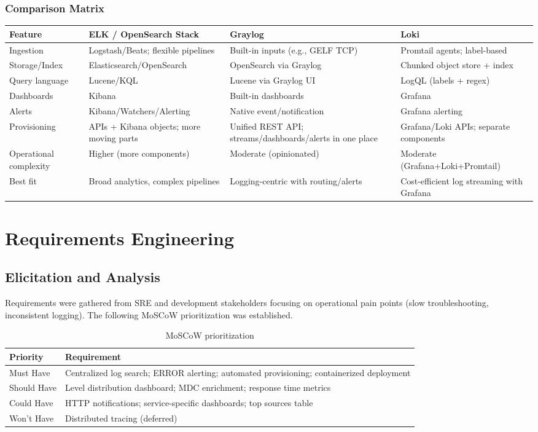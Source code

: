 \documentclass[12pt,a4paper]{report}
\begin{document}
\subsection*{Comparison Matrix}
\begin{longtable}{p{3.2cm} p{3.8cm} p{3.8cm} p{3.8cm}}
\toprule
\textbf{Feature} & \textbf{ELK / OpenSearch Stack} & \textbf{Graylog} & \textbf{Loki} \\
\midrule
\endhead
Ingestion & Logstash/Beats; flexible pipelines & Built-in inputs (e.g., GELF TCP) & Promtail agents; label-based \\
Storage/Index & Elasticsearch/OpenSearch & OpenSearch via Graylog & Chunked object store + index \\
Query language & Lucene/KQL & Lucene via Graylog UI & LogQL (labels + regex) \\
Dashboards & Kibana & Built-in dashboards & Grafana \\
Alerts & Kibana/Watchers/Alerting & Native event/notification & Grafana alerting \\
Provisioning & APIs + Kibana objects; more moving parts & Unified REST API; streams/dashboards/alerts in one place & Grafana/Loki APIs; separate components \\
Operational complexity & Higher (more components) & Moderate (opinionated) & Moderate (Grafana+Loki+Promtail) \\
Best fit & Broad analytics, complex pipelines & Logging-centric with routing/alerts & Cost-efficient log streaming with Grafana \\
\bottomrule
\end{longtable}

\chapter{Requirements Engineering}
\section{Elicitation and Analysis}
Requirements were gathered from SRE and development stakeholders focusing on operational pain points (slow troubleshooting, inconsistent logging). The following MoSCoW prioritization was established.

\begin{table}[H]
\centering
\begin{tabular}{p{3cm} p{11cm}}
\toprule
\textbf{Priority} & \textbf{Requirement} \\
\midrule
Must Have & Centralized log search; ERROR alerting; automated provisioning; containerized deployment \\
Should Have & Level distribution dashboard; MDC enrichment; response time metrics \\
Could Have & HTTP notifications; service-specific dashboards; top sources table \\
Won't Have & Distributed tracing (deferred) \\
\bottomrule
\end{tabular}
\caption{MoSCoW prioritization}
\end{table}
\end{document}
